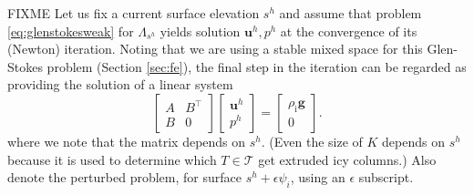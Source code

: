 \documentclass[letterpaper,final,12pt,reqno]{amsart}
\theoremstyle{claim}
\newcommand{\eps}{\epsilon}
\newcommand{\bg}{\mathbf{g}}
\newcommand{\bu}{\mathbf{u}}
\newcommand{\rhoi}{\rho_{\text{i}}}
\numberwithin{equation}{section}
\numberwithin{figure}{section}
\numberwithin{table}{section}
\numberwithin{theorem}{section}
\begin{document}
FIXME Let us fix a current surface elevation $s^h$ and assume that problem \eqref{eq:glenstokesweak} for $\Lambda_{s^h}$ yields solution $\bu^h,p^h$ at the convergence of its (Newton) iteration.  Noting that we are using a stable mixed space for this Glen-Stokes problem (Section \ref{sec:fe}), the final step in the iteration can be regarded as providing the solution of a linear system
\begin{equation}
    \begin{bmatrix} A & B^\top \\
                    B & 0      \end{bmatrix}
    \begin{bmatrix} \bu^h \\ p^h \end{bmatrix}
    = \begin{bmatrix} \rhoi \bg \\ 0 \end{bmatrix}.  \label{eq:system}
\end{equation}
where we note that the matrix depends on $s^h$.  (Even the size of $K$ depends on $s^h$ because it is used to determine which $T\in\mathcal{T}$ get extruded icy columns.)  Also denote the perturbed problem, for surface $s^h + \eps \psi_i$, using an $\eps$ subscript.
\end{document}
